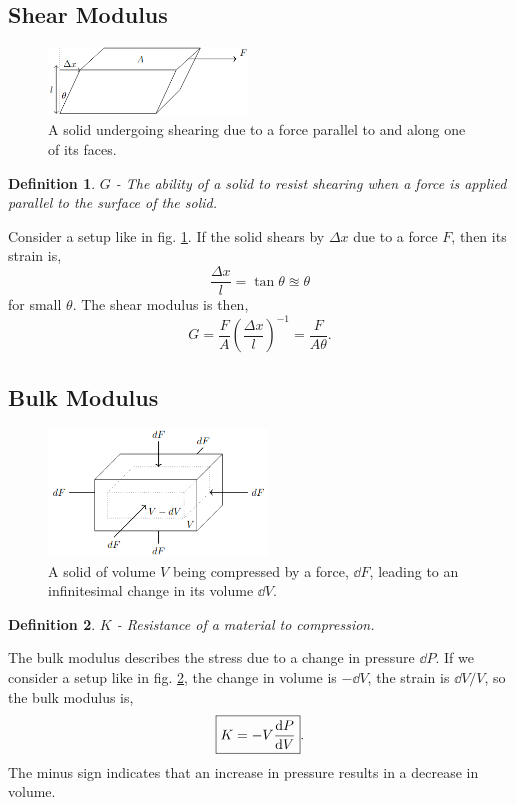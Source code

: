 \documentclass{book}
\newtheorem*{definition}{Definition}
\begin{document}
\subsection{Shear Modulus}
\begin{figure}
	\centering
	\includegraphics[width=200px]{shearmodulus.png}
	\caption{A solid undergoing shearing due to a force parallel to and along one of its faces.} \label{fig:shearmodulus}
\end{figure}
\begin{definition}
	$G$ - The ability of a solid to resist shearing when a force is applied parallel to the surface of the solid.
\end{definition}\noindent
Consider a setup like in fig. \ref{fig:shearmodulus}. If the solid shears by $\Delta x$ due to a force $F$, then its strain is,
\begin{equation}
	\frac{\Delta x}{l} = \tan\theta \approxeq \theta
\end{equation}
for small $\theta$. The shear modulus is then,
\begin{equation}
	\boxed{G = \frac{F}{A}\left(\frac{\Delta x}{l}\right)^{-1} = \frac{F}{A\theta}}.
\end{equation}
\subsection{Bulk Modulus}
\begin{figure}
	\centering
	\includegraphics[width=220px]{bulkmodulus.png}
	\caption{A solid of volume $V$ being compressed by a force, $\dd{F}$, leading to an infinitesimal change in its volume $\dd{V}$.} \label{fig:bulkmodulus}
\end{figure}
\begin{definition}
	$K$ - Resistance of a material to compression.
\end{definition}\noindent
The bulk modulus describes the stress due to a change in pressure $\dd{P}$. If we consider a setup like in fig. \ref{fig:bulkmodulus}, the change in volume is $-\dd{V}$, the strain is $\dd{V}/V$, so the bulk modulus is,
\begin{equation}
	\boxed{K = -V \dv{P}{V}}.
\end{equation}
The minus sign indicates that an increase in pressure results in a decrease in volume.
\end{document}
